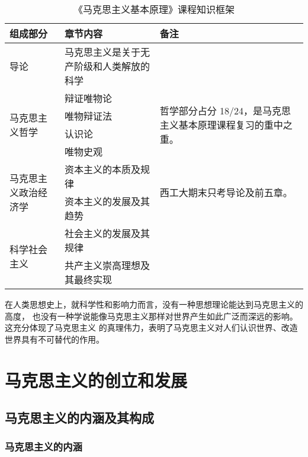 \documentclass[10pt, UTF8]{book} %
\begin{document}
\begin{table}[H]
    \small
    \centering
    \caption{《马克思主义基本原理》课程知识框架}
    \begin{tabular}{p{}|p{}|p{}}
        \hline
        \textbf{组成部分} & \textbf{章节内容} & \textbf{备注} \\
        \hline 
        导论 & 马克思主义是关于无产阶级和人类解放的科学 \\ 
        \hline
        \multirow{4}{0.2\textwidth}{马克思主义哲学} 
        & 辩证唯物论 & \multirow{4}{0.3\textwidth}{哲学部分占分 18/24，是马克思主义基本原理课程复习的重中之重。} \\
        & 唯物辩证法 & \\
        & 认识论 & \\
        & 唯物史观 & \\
        \hline 
        \multirow{2}{0.2\textwidth}{马克思主义政治经济学}
        & 资本主义的本质及规律 
        & \multirow{2}{0.3\textwidth}{西工大期末只考导论及前五章。} \\ 
        & 资本主义的发展及其趋势 & \\ 
        \hline 
        \multirow{2}{0.2\textwidth}{科学社会主义}
        & 社会主义的发展及其规律 & \\ 
        & 共产主义崇高理想及其最终实现 & \\ 
        \hline
    \end{tabular}
\end{table}

在人类思想史上，就科学性和影响力而言，没有一种思想理论能达到马克思主义的高度，
也没有一种学说能像马克思主义那样对世界产生如此广泛而深远的影响。这充分体现了马克思主义
的真理伟力，表明了马克思主义对人们认识世界、改造世界具有不可替代的作用。

\section{马克思主义的创立和发展}

\subsection{马克思主义的内涵及其构成}

\subsubsection{马克思主义的内涵}
\end{document}
